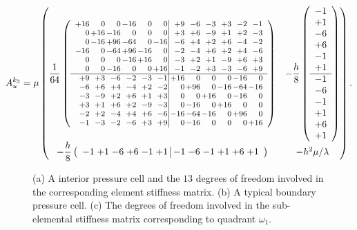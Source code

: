 \begin{equation} \label{eq:chap5.stiffnessmatrix.interior}
A_u^{k_3} =
\mu
\begin{pmatrix}
{\displaystyle \frac{1}{64}}
\lrp{\footnotesize \begin{array}{*{6}{r@{\,}}|*{6}{@{\,}r}}
+16&  0&  0&-16&  0&  0& +9& -6& -3& +3& -2& -1\\
  0&+16&-16&  0&  0&  0& +3& +6& -9& +1& +2& -3\\
  0&-16&+96&-64&  0&-16& -6& +4& +2& +6& -4& -2\\
-16&  0&-64&+96&-16&  0& -2& -4& +6& +2& +4& -6\\
  0&  0&  0&-16&+16&  0& -3& +2& +1& -9& +6& +3\\
  0&  0&-16&  0&  0&+16& -1& -2& +3& -3& -6& +9\\\hline
 +9& +3& -6& -2& -3& -1&+16&  0&  0&  0&-16&  0\\
 -6& +6& +4& -4& +2& -2&  0&+96&  0&-16&-64&-16\\
 -3& -9& +2& +6& +1& +3&  0&  0&+16&  0&-16&  0\\
 +3& +1& +6& +2& -9& -3&  0&-16&  0&+16&  0&  0\\
 -2& +2& -4& +4& +6& -6&-16&-64&-16&  0&+96&  0\\
 -1& -3& -2& -6& +3& +9&  0&-16&  0&  0&  0&+16
\end{array}} &
-{\displaystyle \frac{h}{8}}
\lrp{\begin{array}{c}
-1\\+1\\-6\\+6\\-1\\+1\\\hline-1\\-6\\-1\\+1\\+6\\+1
\end{array}} \\
-{\displaystyle \frac{h}{8}}
\lrp{\begin{array}{*{6}{r@{\;}}|*{6}{@{\;}r}}
-1&+1&-6&+6&-1&+1&-1&-6&-1&+1&+6&+1
\end{array}} &
-h^2 \mu / \lambda
\end{pmatrix}.
\end{equation}

\setlength{\figurewidth}{0.33\textwidth}
\begin{figure}[htbp]
\centering
{}
\caption{(a) A interior pressure cell and the $13$ degrees of freedom involved in the corresponding element stiffness matrix. (b) A typical boundary pressure cell. (c) The degrees of freedom involved in the sub-elemental stiffness matrix corresponding to quadrant $\omega_1$. }
\label{fig:ch5:stiffnessmatrix.element}
\end{figure}

